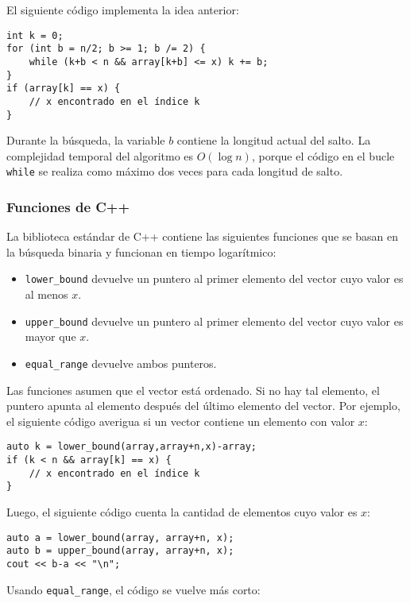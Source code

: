 El siguiente código implementa la idea anterior:
\begin{lstlisting}
int k = 0;
for (int b = n/2; b >= 1; b /= 2) {
    while (k+b < n && array[k+b] <= x) k += b;
}
if (array[k] == x) {
    // x encontrado en el índice k
}
\end{lstlisting}

Durante la búsqueda, la variable $b$
contiene la longitud actual del salto.
La complejidad temporal del algoritmo es $O(\log n)$,
porque el código en el bucle \texttt{while}
se realiza como máximo dos veces para cada longitud de salto.

\subsubsection{Funciones de C++}

La biblioteca estándar de C++ contiene las siguientes funciones
que se basan en la búsqueda binaria y funcionan en tiempo logarítmico:

\begin{itemize}
\item \texttt{lower\_bound} devuelve un puntero al
primer elemento del vector cuyo valor es al menos $x$.
\item \texttt{upper\_bound} devuelve un puntero al
primer elemento del vector cuyo valor es mayor que $x$.
\item \texttt{equal\_range} devuelve ambos punteros.
\end{itemize}

Las funciones asumen que el vector está ordenado.
Si no hay tal elemento, el puntero apunta al
elemento después del último elemento del vector.
Por ejemplo, el siguiente código averigua si
un vector contiene un elemento con valor $x$:

\begin{lstlisting}
auto k = lower_bound(array,array+n,x)-array;
if (k < n && array[k] == x) {
    // x encontrado en el índice k
}
\end{lstlisting}

Luego, el siguiente código cuenta la cantidad de elementos
cuyo valor es $x$:

\begin{lstlisting}
auto a = lower_bound(array, array+n, x);
auto b = upper_bound(array, array+n, x);
cout << b-a << "\n";
\end{lstlisting}

Usando \texttt{equal\_range}, el código se vuelve más corto:

